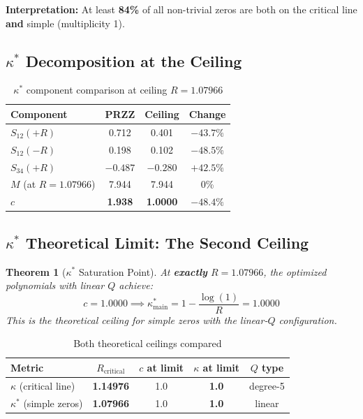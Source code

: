 \documentclass[11pt]{article}
\newtheorem{theorem}{Theorem}
\begin{document}
\textbf{Interpretation:} At least \textbf{84\%} of all non-trivial zeros are both on the critical line \textbf{and} simple (multiplicity 1).

\subsection{$\kappa^*$ Decomposition at the Ceiling}

\begin{table}[h]
\centering
\caption{$\kappa^*$ component comparison at ceiling $R = 1.07966$}
\begin{tabular}{lccc}
\toprule
Component & PRZZ & \textbf{Ceiling} & Change \\
\midrule
$S_{12}(+R)$ & 0.712 & 0.401 & $-43.7\%$ \\
$S_{12}(-R)$ & 0.198 & 0.102 & $-48.5\%$ \\
$S_{34}(+R)$ & $-0.487$ & $-0.280$ & $+42.5\%$ \\
$M$ (at $R=1.07966$) & 7.944 & 7.944 & 0\% \\
\midrule
\textbf{$c$} & \textbf{1.938} & \textbf{1.0000} & \textbf{$-48.4\%$} \\
\bottomrule
\end{tabular}
\end{table}

\subsection{$\kappa^*$ Theoretical Limit: The Second Ceiling}

\begin{theorem}[$\kappa^*$ Saturation Point]
At \textbf{exactly} $R = 1.07966$, the optimized polynomials with linear $Q$ achieve:
\begin{equation}
\boxed{c = 1.0000 \implies \kappa^*_{\text{main}} = 1 - \frac{\log(1)}{R} = 1.0000}
\end{equation}
This is the theoretical ceiling for simple zeros with the linear-$Q$ configuration.
\end{theorem}

\begin{table}[h]
\centering
\caption{Both theoretical ceilings compared}
\begin{tabular}{lcccc}
\toprule
Metric & $R_{\text{critical}}$ & $c$ at limit & $\kappa$ at limit & $Q$ type \\
\midrule
$\kappa$ (critical line) & \textbf{1.14976} & 1.0 & \textbf{1.0} & degree-5 \\
$\kappa^*$ (simple zeros) & \textbf{1.07966} & 1.0 & \textbf{1.0} & linear \\
\bottomrule
\end{tabular}
\end{table}
\end{document}

